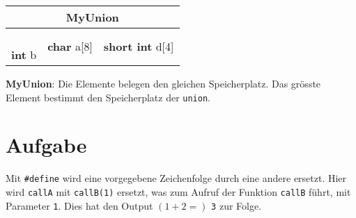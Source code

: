 \documentclass[a4paper,10pt,headlines=3.2]{scrartcl}
\begin{document}
\begin{center}
\begin{tabular}{|l|l|l|}
\hline
\multicolumn{3}{|c|}{MyUnion} \\
\hline
 & \multirow{8}{*}{\textbf{char} a[8]} & \multirow{8}{*}{\textbf{short int} d[4]} \\ 
 & & \\ 
 & & \\ 
 & & \\ \cline{1-1}
\multirow{4}{*}{\textbf{int} b} & & \\ 
 & & \\ 
 & & \\ 
 & & \\ \hline
\end{tabular}
\end{center}
\textbf{MyUnion}: Die Elemente belegen den gleichen Speicherplatz. Das grösste Element bestimmt den Speicherplatz der \texttt{union}.

\section{Aufgabe}
Mit \texttt{\#define} wird eine vorgegebene Zeichenfolge durch eine andere ersetzt. Hier wird \texttt{callA} mit \texttt{callB(1)} ersetzt, was zum Aufruf der Funktion \texttt{callB} führt, mit Parameter \texttt{1}. Dies hat den Output $(1+2=)$ \texttt{3} zur Folge.
\end{document}

